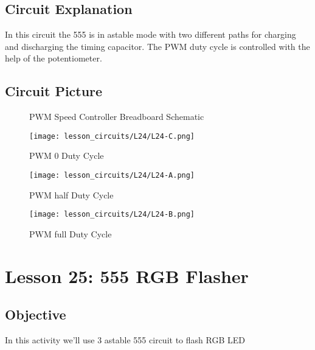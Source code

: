 \subsection{Circuit Explanation}
In this circuit the 555 is in astable mode with two different paths for charging and discharging the timing capacitor. The PWM duty 
cycle is controlled with the help of the potentiometer.
\subsection{Circuit Picture}
\begin{figure}[!htp]
    \centering
    \caption{PWM Speed Controller Breadboard Schematic}
    \label{fig:555_pwm_sch}
\end{figure}
\begin{figure}[!htp]
    \centering
    \texttt{[image: lesson\_circuits/L24/L24-C.png]}
    \caption{PWM 0 Duty Cycle}
    \label{fig:555_pwm_obb}
\end{figure}
\begin{figure}[!htp]
    \centering
    \texttt{[image: lesson\_circuits/L24/L24-A.png]}
    \caption{PWM half Duty Cycle}
    \label{fig:555_pwm_obb1}
\end{figure}
\begin{figure}[!htp]
    \centering
    \texttt{[image: lesson\_circuits/L24/L24-B.png]}
    \caption{PWM full Duty Cycle}
    \label{fig:555_pwm_obb2}
\end{figure}
\clearpage
\section{Lesson 25: 555 RGB Flasher}
\subsection{Objective}
In this activity we'll use 3 astable 555 circuit to flash RGB LED
